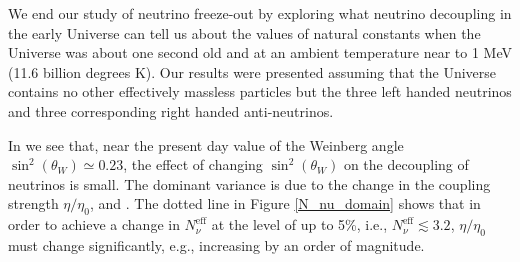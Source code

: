 We end our study of neutrino freeze-out by exploring what neutrino decoupling in the early Universe can tell us about the values of natural constants when the Universe was about one second old and at an ambient temperature near to 1 MeV (11.6 billion degrees K). Our results were presented assuming that the Universe contains no other effectively massless particles but the three left handed neutrinos and  three corresponding right handed anti-neutrinos. 

In  we see that, near  the present day value of the Weinberg angle  $\sin^2(\theta_W)\simeq 0.23$, the effect of changing $\sin^2(\theta_W)$ on the decoupling of neutrinos is small. The dominant variance is due to the change  in the coupling strength $\eta/\eta_0$,   and . The dotted line in  Figure \ref{N_nu_domain} shows that in order to achieve a change in $N_\nu^{\mathrm{eff}}$ at the level of up to 5\%, i.e., $N_\nu^{\mathrm{eff}}\lesssim 3.2 $,   $\eta/\eta_0$ must change significantly, e.g.,  increasing by an order of magnitude.

